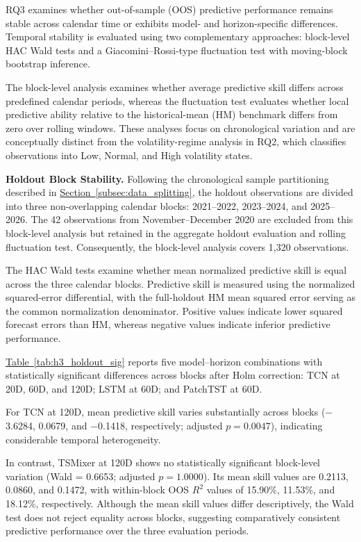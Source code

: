 \documentclass[12pt,twoside]{ord}
\begin{document}
RQ3 examines whether out-of-sample (OOS) predictive performance remains stable across calendar time or exhibits model- and horizon-specific differences. Temporal stability is evaluated using two complementary approaches: block-level HAC Wald tests and a Giacomini--Rossi-type fluctuation test with moving-block bootstrap inference.

The block-level analysis examines whether average predictive skill differs across predefined calendar periods, whereas the fluctuation test evaluates whether local predictive ability relative to the historical-mean (HM) benchmark differs from zero over rolling windows. These analyses focus on chronological variation and are conceptually distinct from the volatility-regime analysis in RQ2, which classifies observations into Low, Normal, and High volatility states.

\medskip
\noindent\textbf{Holdout Block Stability.}
Following the chronological sample partitioning described in \hyperref[subsec:data_splitting]{Section~\ref*{subsec:data_splitting}}, the holdout observations are divided into three non-overlapping calendar blocks: 2021--2022, 2023--2024, and 2025--2026. The 42 observations from November--December 2020 are excluded from this block-level analysis but retained in the aggregate holdout evaluation and rolling fluctuation test. Consequently, the block-level analysis covers 1,320 observations.

The HAC Wald tests examine whether mean normalized predictive skill is equal across the three calendar blocks. Predictive skill is measured using the normalized squared-error differential, with the full-holdout HM mean squared error serving as the common normalization denominator. Positive values indicate lower squared forecast errors than HM, whereas negative values indicate inferior predictive performance.

\hyperref[tab:h3_holdout_sig]{Table~\ref*{tab:h3_holdout_sig}} reports five model--horizon combinations with statistically significant differences across blocks after Holm correction: TCN at 20D, 60D, and 120D; LSTM at 60D; and PatchTST at 60D.

For TCN at 120D, mean predictive skill varies substantially across blocks ($-$3.6284, 0.0679, and $-$0.1418, respectively; adjusted $p=0.0047$), indicating considerable temporal heterogeneity.

In contrast, TSMixer at 120D shows no statistically significant block-level variation (Wald = 0.6653; adjusted $p=1.0000$). Its mean skill values are 0.2113, 0.0860, and 0.1472, with within-block OOS $R^2$ values of 15.90\%, 11.53\%, and 18.12\%, respectively. Although the mean skill values differ descriptively, the Wald test does not reject equality across blocks, suggesting comparatively consistent predictive performance over the three evaluation periods.
\end{document}

